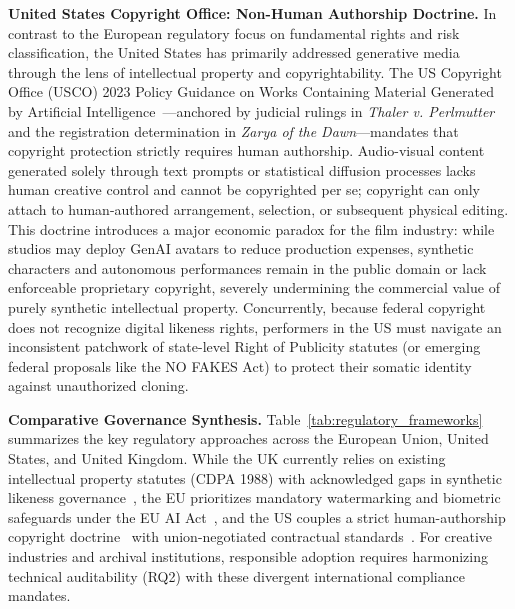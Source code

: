 \documentclass[pdflatex,sn-mathphys-num]{sn-jnl}
\theoremstyle{thmstyleone}
\theoremstyle{thmstyletwo}
\theoremstyle{thmstylethree}
\begin{document}
\textbf{United States Copyright Office: Non-Human Authorship Doctrine.} In contrast to the European regulatory focus on fundamental rights and risk classification, the United States has primarily addressed generative media through the lens of intellectual property and copyrightability. The US Copyright Office (USCO) 2023 Policy Guidance on Works Containing Material Generated by Artificial Intelligence~\cite{usco2023guidance}—anchored by judicial rulings in \textit{Thaler v. Perlmutter} and the registration determination in \textit{Zarya of the Dawn}—mandates that copyright protection strictly requires human authorship. Audio-visual content generated solely through text prompts or statistical diffusion processes lacks human creative control and cannot be copyrighted per se; copyright can only attach to human-authored arrangement, selection, or subsequent physical editing. This doctrine introduces a major economic paradox for the film industry: while studios may deploy GenAI avatars to reduce production expenses, synthetic characters and autonomous performances remain in the public domain or lack enforceable proprietary copyright, severely undermining the commercial value of purely synthetic intellectual property. Concurrently, because federal copyright does not recognize digital likeness rights, performers in the US must navigate an inconsistent patchwork of state-level Right of Publicity statutes (or emerging federal proposals like the NO FAKES Act) to protect their somatic identity against unauthorized cloning.

\textbf{Comparative Governance Synthesis.} Table~\ref{tab:regulatory_frameworks} summarizes the key regulatory approaches across the European Union, United States, and United Kingdom. While the UK currently relies on existing intellectual property statutes (CDPA 1988) with acknowledged gaps in synthetic likeness governance~\cite{pavis2025ai}, the EU prioritizes mandatory watermarking and biometric safeguards under the EU AI Act~\cite{euaiact2024}, and the US couples a strict human-authorship copyright doctrine~\cite{usco2023guidance} with union-negotiated contractual standards~\cite{sagaftra2023summary}. For creative industries and archival institutions, responsible adoption requires harmonizing technical auditability (RQ2) with these divergent international compliance mandates.
\end{document}
